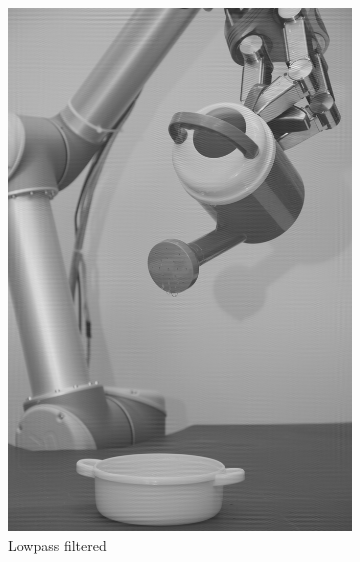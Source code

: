 \begin{figure}[H]
\begin{subfigure}[b]{0.24\textwidth}
        \includegraphics[width=\textwidth]{img4/Image4_2.png}
        \caption{Lowpass filtered}
        \label{fig:img2_src}
    \end{subfigure}
    \begin{subfigure}[b]{0.24\textwidth}

\end{subfigure}
\end{figure}
